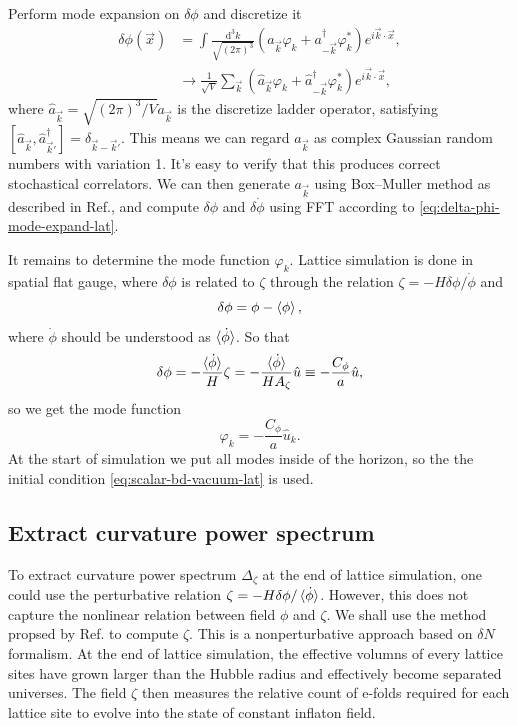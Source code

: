 \documentclass[reprint, 10pt, amsmath, amssymb, floatfix, aps, prd, superscriptaddress, nofootinbib, nobibnotes,twocolumn]{revtex4-1}
\def\dd{{\mathrm{d}}}
\begin{document}
Perform mode expansion on $\delta\phi$ and discretize it
\begin{align}
	\delta\phi(\vec x) & = \int\frac{\dd^3k}{\sqrt{(2\pi)^3}}\left(a_{\vec k} \varphi_k + a_{-\vec k}^\dagger\varphi_k^\ast\right) e^{i\vec k\cdot\vec x},\nonumber\\
	& \to \frac{1}{\sqrt V}\sum_{\vec k}\left(\hat a_{\vec k}\varphi_k + \hat a_{-\vec k}^\dagger\varphi_k^\ast\right)e^{i\vec k\cdot\vec x}\label{eq:delta-phi-mode-expand-lat},
\end{align}
where $\hat a_{\vec k} = \sqrt{(2\pi)^3 / V}a_{\vec k}$ is the discretize ladder operator, satisfying $[\hat a_{\vec k}, \hat a_{\vec k'}^\dagger] = \delta_{\vec k - \vec k'}$. This means we can regard $a_{\vec k}$ as complex Gaussian random numbers with variation 1. It's easy to verify that this produces correct stochastical correlators. We can then generate $a_{\vec k}$ using Box–Muller method as described in Ref.\cite{Caravano:2021pgc}, and compute $\delta\phi$ and $\delta\dot\phi$ using FFT according to \eqref{eq:delta-phi-mode-expand-lat}.

It remains to determine the mode function $\varphi_k$. Lattice simulation is done in spatial flat gauge, where $\delta\phi$ is related to $\zeta$ through the relation $\zeta = -H\delta\phi / \dot\phi$ and
\begin{equation}
	\delta\phi = \phi - \braket{\phi},
\end{equation}
where $\dot\phi$ should be understood as $\braket{\dot\phi}$. So that
\begin{equation}
	\delta\phi = -\frac{\braket{\dot\phi}}{H}\zeta = -\frac{\braket
	{\dot\phi}}{H A_\zeta}\hat u \equiv -\frac{C_\phi}{a}\hat u,
\end{equation}
so we get the mode function
\begin{equation}
	\varphi_k = -\frac{C_\phi}{a}\hat u_k.
\end{equation}
At the start of simulation we put all modes inside of the horizon, so the the initial condition \eqref{eq:scalar-bd-vacuum-lat} is used.

\subsection{Extract curvature power spectrum}
To extract curvature power spectrum $\Delta_\zeta$ at the end of lattice simulation, one could use the perturbative relation $\zeta = -H\delta\phi / \braket{\dot\phi}$. However, this does not capture the nonlinear relation between field $\phi$ and $\zeta$. We shall use the method propsed by Ref.\cite{Caravano:2025diq} to compute $\zeta$. This is a nonperturbative approach based on $\delta N$ formalism. At the end of lattice simulation, the effective volumns of every lattice sites have grown larger than the Hubble radius and effectively become separated universes. The field $\zeta$ then measures the relative count of e-folds required for each lattice site to evolve into the state of constant inflaton field.
\end{document}
